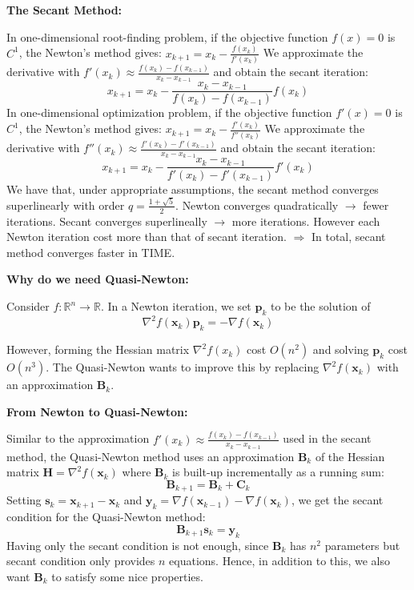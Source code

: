 \documentclass[11pt]{article}
\theoremstyle{plain} %
\newenvironment{topic}
{\color{C2}\normalfont\begin{framed}\begingroup }
  {\endgroup\end{framed}}
\theoremstyle{remark}
\newenvironment{remark}
  {\pushQED{\qed}\renewcommand{\qedsymbol}{$\triangle$}\remarkx}
  {\popQED\endremarkx}
\begin{document}
\begin{topic}
  \textbf{The Secant Method:}

  In one-dimensional root-finding problem, if the objective function $f(x) = 0$ is $C^1$, the Newton's method gives:
  $
    x_{k+1} = x_k -\frac{f(x_k)}{f'(x_k)}
  $
  We approximate the derivative with $f'(x_k) \approx \frac{f(x_k) -
      f(x_{k-1})}{x_k - x_{k-1}}$ and obtain the secant iteration:
  $$
    x_{k+1} = x_k - \frac{x_k - x_{k-1}}{f(x_k) - f(x_{k-1})}f(x_k)
  $$
  In one-dimensional optimization problem, if the objective function $f'(x) = 0$ is $C^1$, the Newton's method gives:
  $
    x_{k+1} = x_k -\frac{f'(x_k)}{f''(x_k)}
  $
  We approximate the derivative with $f''(x_k) \approx \frac{f'(x_k) -
      f'(x_{k-1})}{x_k - x_{k-1}}$ and obtain the secant iteration:
  $$
    x_{k+1} = x_k - \frac{x_k - x_{k-1}}{f'(x_k) - f'(x_{k-1})}f'(x_k)
  $$
  We have that, under appropriate assumptions, the secant method
  converges superlinearly with order $q=\frac{1+\sqrt{5}}{2}$.
  \begin{remark}
    Newton converges quadratically $\rightarrow$ fewer iterations.
    Secant converges superlineally $\rightarrow$ more iterations.
    However each Newton iteration cost more
    than that of secant iteration.
    $\Rightarrow$ In total, secant method converges faster in TIME.
  \end{remark}

  \textbf{Why do we need Quasi-Newton:}

  Consider $f: \mathbb{R}^n \rightarrow \mathbb{R}$. In a Newton iteration, we set $\mathbf{p}_k$ to be the solution of
  $$
    \nabla^2 f\left(\mathbf{x}_k\right) \mathbf{p}_k =-\nabla f\left(\mathbf{x}_k\right)
  $$

  However, forming the Hessian matrix $\nabla^2 f\left(x_k\right)$ cost $O\left(n^2\right)$ and
  solving $\mathbf{p}_k$ cost $O\left(n^3\right)$. The Quasi-Newton wants to improve this by
  replacing $\nabla^2 f\left(\mathbf{x}_k\right)$ with an approximation $\mathbf{B}_k$.

  \textbf{From Newton to Quasi-Newton:}

  Similar to the approximation $f'(x_k) \approx \frac{f(x_k) -
      f(x_{k-1})}{x_k - x_{k-1}}$ used in the secant method, the Quasi-Newton method
  uses an approximation $\mathbf{B}_k$ of the Hessian matrix $\mathbf{H} = \nabla^2 f\left(\mathbf{x}_k\right)$
  where $\mathbf{B}_k$ is built-up incrementally as a running sum:
  $$
    \mathbf{B}_{k+1}=\mathbf{B}_k+\mathbf{C}_k
  $$
  Setting $\mathbf{s}_k=\mathbf{x}_{k+1}-\mathbf{x}_k$
  and $\mathbf{y}_k=\nabla f\left(\mathbf{x}_{k-1}\right)-\nabla f\left(\mathbf{x}_k\right)$, we get the secant
  condition for the Quasi-Newton method:
  $$
    \mathbf{B}_{k+1} \mathbf{s}_k=\mathbf{y}_k
  $$
  Having only the secant condition is not enough, since $\mathbf{B}_k$ has $n^2$ parameters but secant condition only provides
  $n$ equations. Hence, in addition to this, we also want $\mathbf{B}_k$ to satisfy some nice properties.


\end{topic}
\end{document}
